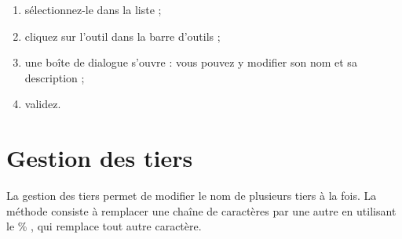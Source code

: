\begin{enumerate}
	\ifIllustration
	\label{thirdparties-infos-img}
	\fi
	 \item sélectionnez-le dans la liste ;
	 \item cliquez sur l'outil  dans la barre d'outils ;
	 \item une boîte de dialogue s'ouvre : vous pouvez y modifier son nom et sa  description ;
	 \item validez.
\end{enumerate}

\ifIllustration
\fi

\ifIllustration
\fi


\section{Gestion des tiers\label{thirdparties-management}}


La gestion des tiers permet de modifier le nom de plusieurs tiers à la fois. La méthode consiste à remplacer une chaîne de caractères par une autre en utilisant le   \og  \%  \fg{}, qui remplace tout autre caractère.

